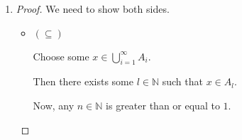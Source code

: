 \documentclass[12pt,letterpaper]{article}
\begin{document}
\begin{enumerate}
\begin{enumerate}
\begin{enumerate}
\begin{proof}
\begin{itemize}
                    Then every $x$ contained in $\bigcap\limits_{i = 1}^k A_i$ is also in $A_k$.

                    Thus, $\bigcap\limits_{i = 1}^k A_i \subseteq A_k$.

                  \item $(\supseteq)$

                    Choose some $x \in A_k$.

                    Since $\mathcal{A}$ is a decreasing nested family of sets,
                    for any $i \in \mathbb{N} \leq k, A_k \subseteq A_i$.

                    Now, since $x$ is an element of $A_k$, $x$ is an element of all supersets of $A_k$.

                    That is to say that $x \in A_{k-1} \land x \in A_{k-2} \land \dots \land x \in A_1$.

                    So $x \in \bigcap\limits_{i = 1}^k A_i$.

                    Since the choice of $x$ was arbitrary, this works for all $x \in A_k$.

                    Then every $x$ contained in $A_k$ is also in $\bigcap\limits_{i = 1}^k A_i$.

                    Thus, $A_k \subseteq \bigcap\limits_{i = 1}^k A_i$.
                \end{itemize}

                Since we have shown both $\bigcap\limits_{i = 1}^k A_i \subseteq A_k$,
                and $A_k \subseteq \bigcap\limits_{i = 1}^k A_i$, for any $k \in \mathbb{N}$.

                We have shown that for all $k \in \mathbb{N}, \bigcap\limits_{i = 1}^k A_i = A_k$.
              \end{proof}
            \item
              \begin{proof}
                We need to show both sides.

                \begin{itemize}
                  \item $(\subseteq)$

                    Choose some $x \in \bigcup\limits_{i = 1}^{\infty} A_i$.

                    Then there exists some $l \in \mathbb{N}$ such that $x \in A_l$.

                    Now, any $n \in \mathbb{N}$ is greater than or equal to $1$.


\end{itemize}
\end{proof}
\end{enumerate}
\end{enumerate}
\end{enumerate}
\end{document}
